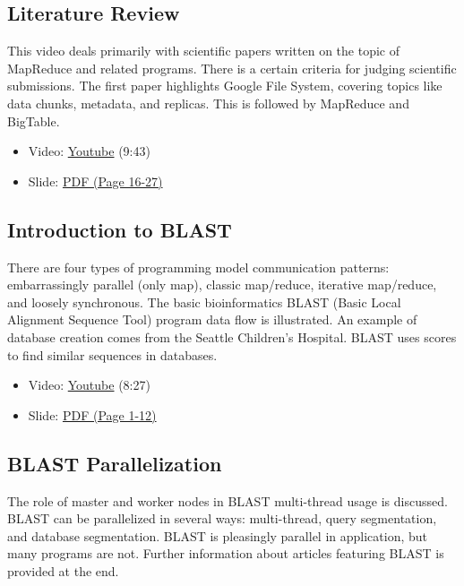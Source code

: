 \subsection{Literature Review}\label{literature-review}

This video deals primarily with scientific papers written on the topic
of MapReduce and related programs. There is a certain criteria for
judging scientific submissions. The first paper highlights Google File
System, covering topics like data chunks, metadata, and replicas. This
is followed by MapReduce and BigTable.

\begin{itemize}
\tightlist
\item
  Video: \href{https://www.youtube.com/watch?v=5YmjrhEFQsk}{Youtube}
  (9:43)
\item
  Slide:
  \href{https://drive.google.com/open?id=0B88HKpainTSfd3hkTG4yY2FYUVE}{PDF
  (Page 16-27)}
\end{itemize}

\subsection{Introduction to BLAST}\label{introduction-to-blast}

There are four types of programming model communication patterns:
embarrassingly parallel (only map), classic map/reduce, iterative
map/reduce, and loosely synchronous. The basic bioinformatics BLAST
(Basic Local Alignment Sequence Tool) program data flow is illustrated.
An example of database creation comes from the Seattle Children's
Hospital. BLAST uses scores to find similar sequences in databases.

\begin{itemize}
\tightlist
\item
  Video: \href{https://www.youtube.com/watch?v=i3H9HmUYfq8}{Youtube}
  (8:27)
\item
  Slide:
  \href{https://drive.google.com/open?id=0B88HKpainTSfdnFvY1V3dlFTRlE}{PDF
  (Page 1-12)}
\end{itemize}

\subsection{BLAST Parallelization}\label{blast-parallelization}

The role of master and worker nodes in BLAST multi-thread usage is
discussed. BLAST can be parallelized in several ways: multi-thread,
query segmentation, and database segmentation. BLAST is pleasingly
parallel in application, but many programs are not. Further information
about articles featuring BLAST is provided at the end.

